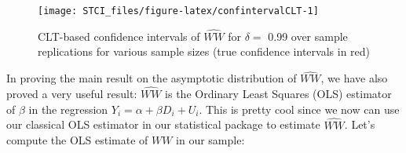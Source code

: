 \documentclass[]{book}
\newenvironment{Shaded}{\begin{snugshade}}{\end{snugshade}}
\newcommand{\DataTypeTok}[1]{\textcolor[rgb]{0.13,0.29,0.53}{#1}}
\newcommand{\DecValTok}[1]{\textcolor[rgb]{0.00,0.00,0.81}{#1}}
\newcommand{\KeywordTok}[1]{\textcolor[rgb]{0.13,0.29,0.53}{\textbf{#1}}}
\newcommand{\NormalTok}[1]{#1}
\newcommand{\OperatorTok}[1]{\textcolor[rgb]{0.81,0.36,0.00}{\textbf{#1}}}
\newcommand{\StringTok}[1]{\textcolor[rgb]{0.31,0.60,0.02}{#1}}
\theoremstyle{definition}
\theoremstyle{definition}
\theoremstyle{definition}
\theoremstyle{remark}
\let\BeginKnitrBlock\begin \let\EndKnitrBlock\end
\begin{document}
\begin{Shaded}
\end{Shaded}

\begin{figure}[htbp]

{\centering \texttt{[image: STCI\_files/figure-latex/confintervalCLT-1]} 

}

\caption{CLT-based confidence intervals of $\hat{WW}$ for $\delta=$ 0.99 over sample replications for various sample sizes (true confidence intervals in red)}\label{fig:confintervalCLT}
\end{figure}

\BeginKnitrBlock{remark}
\iffalse{} {Remark. } \fi{}In proving the main result on the asymptotic distribution of \(\hat{WW}\), we have also proved a very useful result: \(\hat{WW}\) is the Ordinary Least Squares (OLS) estimator of \(\beta\) in the regression \(Y_i=\alpha+\beta D_i + U_i\).
This is pretty cool since we now can use our classical OLS estimator in our statistical package to estimate \(\hat{WW}\).
Let's compute the OLS estimate of \(WW\) in our sample:
\EndKnitrBlock{remark}
\end{document}
